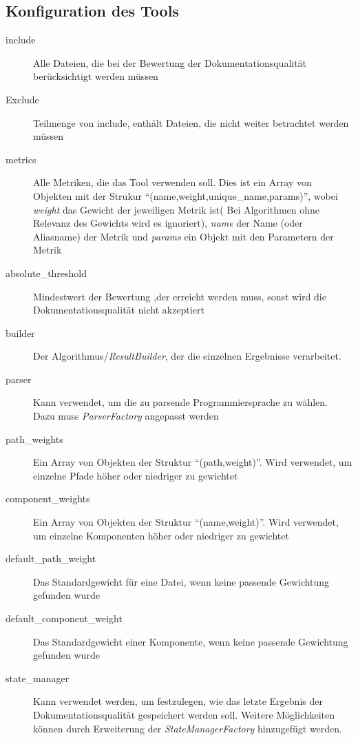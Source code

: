 \begin{appendices}
\chapter{Konfiguration des Tools}
\begin{description}
        \item[include]  Alle Dateien, die bei der Bewertung der Dokumentationsqualität berücksichtigt werden müssen
        \item[Exclude]  Teilmenge von include, enthält Dateien, die nicht weiter betrachtet werden müssen
        \item[metrics]  Alle Metriken, die das Tool verwenden soll. Dies ist ein Array von Objekten mit der Strukur \enquote{(name,weight,unique\_name,params)}, wobei \textit{weight} das Gewicht der jeweiligen Metrik ist( Bei Algorithmen ohne Relevanz des Gewichts wird es ignoriert), \textit{name} der Name (oder Aliasname) der Metrik und \textit{params} ein Objekt mit den Parametern der Metrik
        \item[absolute\_threshold] Mindestwert der Bewertung ,der erreicht werden muss, sonst wird die Dokumentationsqualität nicht akzeptiert
       
          \item[builder] Der Algorithmus/\textit{ResultBuilder}, der die einzelnen Ergebnisse verarbeitet.
        
        \item[parser]  Kann verwendet, um die zu parsende Programmiersprache zu wählen. Dazu muss \textit{ParserFactory} angepasst werden
        
        \item[path\_weights] Ein Array von Objekten der Struktur \enquote{(path,weight)}. Wird verwendet, um einzelne Pfade höher oder niedriger zu gewichtet
        
         \item[component\_weights] Ein Array von Objekten der Struktur \enquote{(name,weight)}. Wird verwendet, um einzelne Komponenten höher oder niedriger zu gewichtet
         
         \item[default\_path\_weight] Das Standardgewicht für eine Datei, wenn keine passende Gewichtung gefunden wurde
         
         \item[default\_component\_weight] Das Standardgewicht einer Komponente, wenn keine passende Gewichtung gefunden wurde
         
         \item[state\_manager] Kann verwendet werden, um festzulegen, wie das letzte Ergebnis der Dokumentationsqualität gespeichert werden soll. Weitere Möglichkeiten können durch Erweiterung der \textit{StateManagerFactory} hinzugefügt werden.
         

\end{description}
\end{appendices}
